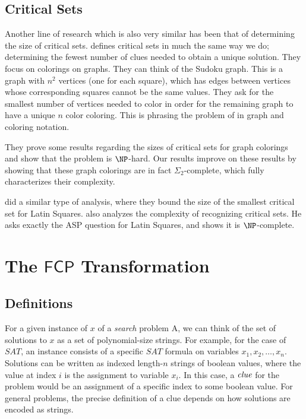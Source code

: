 \documentclass[runningheads,a4paper]{llncs}
\begin{document}
\subsection{Critical Sets}

Another line of research which is also very similar has been that of determining the size of critical sets. \cite{Cooper:2014:CSS:2612293.2612628} defines critical sets in much the same way we do; determining the fewest number of clues needed to obtain a unique solution. They focus on colorings on graphs. They can think of the Sudoku graph. This is a graph with $n^2$ vertices (one for each square), which has edges between vertices whose corresponding squares cannot be the same values. They ask for the smallest number of vertices needed to color in order for the remaining graph to have a unique $n$ color coloring. This is phrasing the problem of \cite{mcguire2012there} in graph and coloring notation. 

They prove some results regarding the sizes of critical sets for graph colorings and show that the problem is $\NP$-hard. Our results improve on these results by showing that these graph colorings are in fact $\Sigma_2$-complete, which fully characterizes their complexity.

\cite{Ghandehari2005121} did a similar type of analysis, where they bound the size of the smallest critical set for Latin Squares. \cite{colbourn1984computational} also analyzes the complexity of recognizing critical sets. He asks exactly the ASP question for Latin Squares, and shows it is $\NP$-complete.



\section{The $\mathsf{FCP}$ Transformation}
\label{sec:prelim}

\subsection{Definitions}

For a given instance of $x$ of a \emph{search} problem A, we can think of the set of solutions to $x$ as a set of polynomial-size strings. For example, for the case of $SAT$, an instance consists of a specific $SAT$ formula on variables $x_1,x_2,\dots,x_n$. Solutions can be written as indexed length-$n$ strings of boolean values, where the value at index $i$ is the assignment to variable $x_i$. In this case, a $\emph{clue}$ for the problem would be an assignment of a specific index to some boolean value. For general problems, the precise definition of a clue depends on how solutions are encoded as strings.
\end{document}
